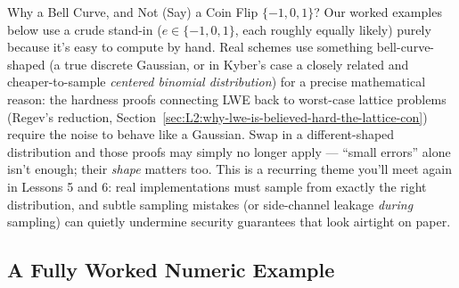 \begin{center}
\end{center}

\begin{rmkbox}{Why a Bell Curve, and Not (Say) a Coin Flip $\{-1,0,1\}$?}
Our worked examples below use a crude stand-in ($e\in\{-1,0,1\}$, each roughly equally likely) purely because it's easy to compute by hand. Real schemes use something bell-curve-shaped (a true discrete Gaussian, or in Kyber's case a closely related and cheaper-to-sample \emph{centered binomial distribution}) for a precise mathematical reason: the hardness proofs connecting LWE back to worst-case lattice problems (Regev's reduction, Section~\ref{sec:L2:why-lwe-is-believed-hard-the-lattice-con}) require the noise to behave like a Gaussian. Swap in a different-shaped distribution and those proofs may simply no longer apply --- ``small errors'' alone isn't enough; their \emph{shape} matters too. This is a recurring theme you'll meet again in Lessons 5 and 6: real implementations must sample from exactly the right distribution, and subtle sampling mistakes (or side-channel leakage \emph{during} sampling) can quietly undermine security guarantees that look airtight on paper.
\end{rmkbox}

\subsection{A Fully Worked Numeric Example}
\label{sec:L2:a-fully-worked-numeric-example}

